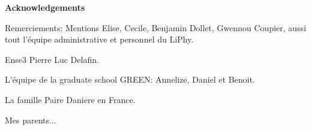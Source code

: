 \begin{center}
	\textbf{\Large{Acknowledgements}}
\end{center}

\vspace{0.5cm}

\justifying
Remerciements: Mentions Elise, Cecile, Benjamin Dollet, Gwennou Coupier, aussi tout l'équipe administrative et personnel du LiPhy.

Ense3 Pierre Luc Delafin.

L'équipe de la graduate school GREEN: Annelize, Daniel et Benoit.

La famille Paire Daniere en France.

Mes parents...


\vspace{3cm}

\clearpage